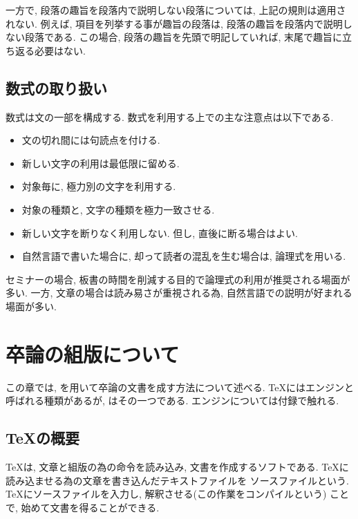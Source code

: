 \documentclass[12pt,xelatex,ja=standard]{bxjsarticle}
\begin{document}
一方で,
段落の趣旨を段落内で説明しない段落については,
上記の規則は適用されない.
例えば,
項目を列挙する事が趣旨の段落は,
段落の趣旨を段落内で説明しない段落である.
この場合,
段落の趣旨を先頭で明記していれば,
末尾で趣旨に立ち返る必要はない.

\subsection{数式の取り扱い}
数式は文の一部を構成する.
数式を利用する上での主な注意点は以下である.
\begin{itemize}
\item 文の切れ間には句読点を付ける.
\item 新しい文字の利用は最低限に留める.
\item 対象毎に, 極力別の文字を利用する.
\item 対象の種類と, 文字の種類を極力一致させる.
\item 新しい文字を断りなく利用しない. 但し, 直後に断る場合はよい.
\item 自然言語で書いた場合に, 却って読者の混乱を生む場合は,
論理式を用いる.
\end{itemize}

\begin{Remark}
セミナーの場合, 板書の時間を削減する目的で論理式の利用が推奨される場面が多い.
一方, 文章の場合は読み易さが重視される為,
自然言語での説明が好まれる場面が多い.
\end{Remark}

\section{卒論の組版について}
この章では,
\XeLaTeX を用いて卒論の文書を成す方法について述べる.
\TeX にはエンジンと呼ばれる種類があるが,
\XeLaTeX はその一つである.
エンジンについては付録で触れる.

\subsection{\TeX の概要}
\TeX は, 文章と組版の為の命令を読み込み,
文書を作成するソフトである.
\TeX に読み込ませる為の文章を書き込んだテキストファイルを
ソースファイルという.
\TeX にソースファイルを入力し,
解釈させる(この作業をコンパイルという)
ことで, 始めて文書を得ることができる.
\end{document}

